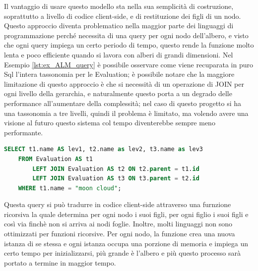 \hfill\break
Il vantaggio di usare questo modello sta nella sua semplicità di costruzione, soprattutto a livello di codice client-side, 
e di restituzione dei figli di un nodo. Questo approccio diventa problematico nella maggior parte dei linguaggi 
di programmazione perché necessita di una query per ogni nodo dell'albero, e visto che ogni query impiega 
un certo periodo di tempo, questo rende la funzione molto lenta e poco efficiente quando si lavora con alberi di grandi dimensioni. 
Nel Esempio \ref{lst:ex_ALM_query} è possibile osservare come viene recuparata in puro Sql l'intera tassonomia per le Evaluation; 
è possibile notare che la maggiore limitazione di questo approccio è che si necessità di un operazione di JOIN per ogni livello 
della gerarchia, e naturalmente questo porta a un degrado delle performance all'aumentare della complessità; nel caso di questo progetto
si ha una tassonomia a tre livelli, quindi il problema è limitato, ma volendo avere una visione al futuro questo sistema col tempo diventerebbe 
sempre meno performante.
\begin{lstlisting}[language=SQL, label=lst:ex_ALM_query, caption={Query in puro Sql per recuperare l'intera tassonomia delle Evaluation, 
    secondo l'Adjacency List Model.}]
SELECT t1.name AS lev1, t2.name as lev2, t3.name as lev3
    FROM Evaluation AS t1
        LEFT JOIN Evaluation AS t2 ON t2.parent = t1.id
        LEFT JOIN Evaluation AS t3 ON t3.parent = t2.id
    WHERE t1.name = "moon cloud";
\end{lstlisting}
Questa query si può tradurre in codice client-side attraverso una furnzione ricorsiva la quale determina per ogni nodo i suoi figli, per ogni figlio
i suoi figli e così via finchè non si arriva ai nodi foglie.
Inoltre, molti linguaggi non sono ottimizzati per funzioni ricorsive. Per ogni nodo, la funzione crea una nuova istanza di se stessa e 
ogni istanza occupa una porzione di memoria e impiega un certo tempo per inizializzarsi, più grande è l'albero e più questo processo sarà portato a termine 
in maggior tempo.
%
\newpage
%
